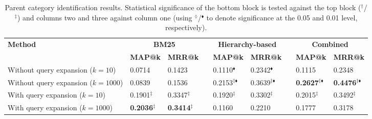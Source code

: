 \begin{table*}[t]
  \centering
  \caption{Parent category identification results. Statistical significance of the bottom block is tested against the top block ($^\dag$/$^\ddag$) and columns two and three against column one (using $^{\scriptscriptstyle\lozenge}$/$^{\scriptscriptstyle\blacklozenge}$ to denote significance at the 0.05 and 0.01 level, respectively).}
  \begin{tabular}{lllllllll}
    \toprule
    \textbf{Method} & \multicolumn{2}{c}{\textbf{BM25}} && \multicolumn{2}{c}{\textbf{Hierarchy-based}} && \multicolumn{2}{c}{\textbf{Combined}} \\
    \cline{2-3}  \cline{5-6} \cline{8-9}
      & \textbf{MAP@k} & \textbf{MRR@k} && \textbf{MAP@k} & \textbf{MRR@k} && \textbf{MAP@k} & \textbf{MRR@k}  \\

    \midrule
	 Without query expansion ($k=10$)  & 0.0714 & 0.1423 && 0.1110$^{\scriptscriptstyle\blacklozenge}$ & 0.2342$^{\scriptscriptstyle\blacklozenge}$ && 0.1115 & 0.2348 \\
	 Without query expansion ($k=1000$)  & 0.0839 &0.1536&& 0.2153$^{\ddag\scriptscriptstyle\blacklozenge}$ &0.3639$^{\ddag\scriptscriptstyle\blacklozenge}$ && \textbf{0.2627}$^{\ddag\scriptscriptstyle\blacklozenge}$ & \textbf{0.4476}$^{\ddag\scriptscriptstyle\blacklozenge}$ \\
	\midrule %
	 With query expansion ($k=10$)  & 0.1901$^\ddag$ &0.3347$^\ddag$&& 0.1920$^\ddag$ &0.3302$^\ddag$&& 0.2015$^\ddag$ &0.3492$^\ddag$ \\
	 With query expansion ($k=1000$) & \textbf{0.2036$^\ddag$} & \textbf{0.3414$^\ddag$} && 0.1160 &0.2210&& 0.1777 & 0.3178 \\
    \bottomrule
  \end{tabular}
  \label{tbl:cgi}
\end{table*}